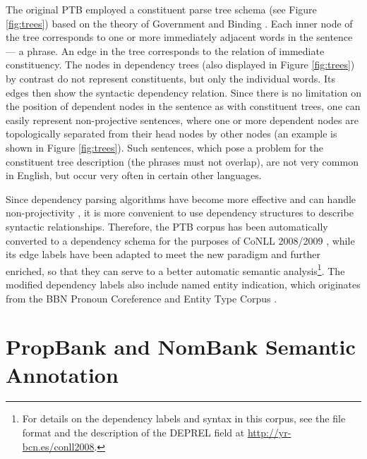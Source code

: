 \documentclass[12pt,notitlepage,a4paper]{report}
\begin{document}
The original PTB employed a constituent parse tree schema (see Figure \ref{fig:trees}) based on the theory of Government and Binding \citep{chomsky81}. Each inner node of the tree corresponds to one or more immediately adjacent words in the sentence --- a phrase. An edge in the tree corresponds to the relation of immediate constituency. The nodes in dependency trees (also displayed in Figure \ref{fig:trees}) by contrast do not represent constituents, but only the individual words. Its edges then show the syntactic dependency relation. Since there is no limitation on the position of dependent nodes in the sentence as with constituent trees, one can easily represent non-projective sentences, where one or more dependent nodes are topologically separated from their head nodes by other nodes (an example is shown in Figure \ref{fig:trees}). Such sentences, which pose a problem for the constituent tree description (the phrases must not overlap), are not very common in English, but occur very often in certain other languages.

Since dependency parsing algorithms have become more effective and can handle non-projectivity \citep[cf.][]{mcdonald05}, it is more convenient to use dependency structures to describe syntactic relationships. Therefore, the PTB corpus has been automatically converted to a dependency schema for the purposes of CoNLL 2008/2009 \citep{johansson07,surdeanu08}, while its edge labels have been adapted to meet the new paradigm and further enriched, so that they can serve to a better automatic semantic analysis\footnote{For details on the dependency labels and syntax in this corpus, see the file format and the description of the DEPREL field at \url{http://yr-bcn.es/conll2008}.}. The modified dependency labels also include named entity indication, which originates from the BBN Pronoun Coreference and Entity Type Corpus \citep{weischedel05}.

\section{PropBank and NomBank Semantic Annotation}\label{propbank-nombank}
\end{document}
